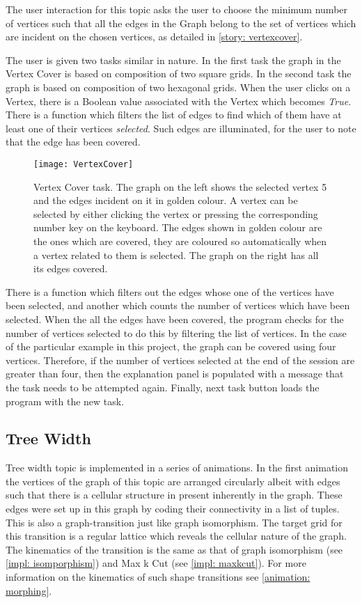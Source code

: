 The user interaction for this topic asks the user to choose the minimum number
of vertices such that all the edges in the Graph belong to the set of vertices
which are incident on the chosen vertices, as detailed in \autoref{story: vertexcover}.

The user is given two tasks similar in nature. In the first task the graph in
the Vertex Cover is based on composition of two square grids. In the second
task the graph is based on composition of two hexagonal grids.  When the user
clicks on a Vertex, there is a Boolean value associated with the Vertex which
becomes \emph{True}. There is a function which filters the list of edges to
find which of them have at least one of their vertices \emph{selected}. Such
edges are illuminated, for the user to note that the edge has been covered.

\begin{figure}[ht]
\centering
\texttt{[image: VertexCover]}
\caption{
        Vertex Cover task. The graph on the left shows the selected vertex 5
        and the edges incident on it in golden colour. A vertex can be selected
        by either clicking the vertex or pressing the corresponding number key
        on the keyboard. The edges shown in golden colour are the ones which are
        covered, they are coloured so automatically when a vertex related to
        them is selected. The graph on the right has all its edges covered.
        }
\label{animationfigure: vertexCover}
\end{figure}

There is a function which filters out the edges whose one of the vertices
have been selected, and another which counts the number of vertices which
have been selected.  When the all the edges have been covered, the program
checks for the number of vertices selected to do this by filtering the list of
vertices. In the case of the particular example in this project, the graph can
be covered using four vertices. Therefore, if the number of vertices selected at
the end of the session are greater than four, then the explanation panel is
populated with a message that the task needs to be attempted again. Finally, next task button loads the program with the new task.

\subsection{Tree Width}
Tree width topic is implemented in a series of animations.  In the first
animation the vertices of the graph of this topic are arranged circularly
albeit with edges such that there is a cellular structure in present inherently
in the graph. These edges were set up in this graph by coding their connectivity
in a list of tuples.
This is also a graph-transition just like graph isomorphism. The target grid
for this transition is a regular lattice which reveals the cellular nature of
the graph. The kinematics of the transition is the same as that of graph
isomorphism (see \autoref{impl: isomporphism}) and Max k Cut (see
\autoref{impl: maxkcut}). For more information on the kinematics of such shape
transitions see \autoref{animation: morphing}.

